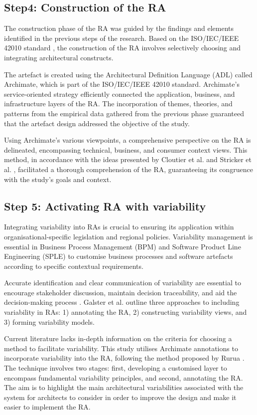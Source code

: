 \documentclass[preprint,12pt]{elsarticle}
\begin{document}
\subsection{Step4: Construction of the RA}

The construction phase of the RA was guided by the findings and elements identified in the previous steps of the research. Based on the ISO/IEC/IEEE 42010 standard \cite{ISO42010}, the construction of the RA involves selectively choosing and integrating architectural constructs.

The artefact is created using the Architectural Definition Language (ADL) called Archimate, which is part of the ISO/IEC/IEEE 42010 standard. Archimate's service-oriented strategy efficiently connected the application, business, and infrastructure layers of the RA. The incorporation of themes, theories, and patterns from the empirical data gathered from the previous phase guaranteed that the artefact design addressed the objective of the study.

Using Archimate's various viewpoints, a comprehensive perspective on the RA is delineated, encompassing technical, business, and consumer context views. This method, in accordance with the ideas presented by Cloutier et al. \cite{Cloutier2010} and Stricker et al. \cite{stricker2010creating}, facilitated a thorough comprehension of the RA, guaranteeing its congruence with the study's goals and context.

\subsection{Step 5: Activating RA with variability}

Integrating variability into RAs is crucial to ensuring its application within organisational-specific legislation and regional policies. Variability management is essential in Business Process Management (BPM) and Software Product Line Engineering (SPLE) to customise business processes and software artefacts according to specific contextual requirements.

Accurate identification and clear communication of variability are essential to encourage stakeholder discussion, maintain decision traceability, and aid the decision-making process \cite{czarnecki2012cool}. Galster et al. \cite{GALSTER2011Empirically} outline three approaches to including variability in RAs: 1) annotating the RA, 2) constructing variability views, and 3) forming variability models.

Current literature lacks in-depth information on the criteria for choosing a method to facilitate variability. This study utilises Archimate annotations to incorporate variability into the RA, following the method proposed by Rurua \cite{rurua2019representing}. The technique involves two stages: first, developing a customised layer to encompass fundamental variability principles, and second, annotating the RA. The aim is to highlight the main architectural variabilities associated with the system for architects to consider in order to improve the design and make it easier to implement the RA.
\end{document}

